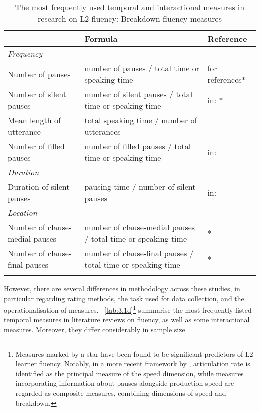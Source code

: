 \begin{table}[p]
\footnotesize
\caption{\label{tab:3.1b}The most frequently used temporal and interactional measures in research on L2 fluency: Breakdown fluency measures}
\begin{tabularx}{\textwidth}{Q@{}QQ}
\lsptoprule
{} & Formula & {Reference}\\
\midrule
\textit{Frequency} & ~ & ~\\
\midrule
Number of pauses & number of pauses / total time or speaking time & \citet{SaitoEtAl2018} for references*\\
Number of silent pauses & number of silent pauses / total time or speaking time & \citet{Kormos2006} in: \citet{DeJong2016}*\\
Mean length of utterance & total speaking time / number of utterances & \citet{DeJong2016}\\
Number of filled pauses & number of filled pauses / total time or speaking time & \citet{Kormos2006} in: \citet{DeJong2016}\\
\midrule
\textit{Duration} & ~ & ~\\
\midrule
Duration of silent pauses & pausing time / number of silent pauses & \citet{Kormos2006} in: \citet{DeJong2016}\\
\midrule
\textit{Location} & ~ & ~\\
\midrule
Number of clause-medial pauses & number of clause-medial pauses / total time or speaking time & \citet{SaitoEtAl2018}*\\
Number of clause-final pauses & number of clause-final pauses / total time or speaking time & \citet{SaitoEtAl2018}*\\
\lspbottomrule
\end{tabularx}
\end{table}


However, there are several differences in methodology across these studies, in particular regarding rating methods, the task used for data collection, and the operationalisation of measures. --\ref{tab:3.1d}\footnote{Measures marked by a star have been found to be significant predictors of L2 learner fluency. Notably, in a more recent framework by \citet{TavakoliNakatsuharaHunter2020}, articulation rate is identified as the principal measure of the speed dimension, while measures incorporating information about pauses alongside production speed are regarded as composite measures, combining dimensions of speed and breakdown.} summarise the most frequently listed temporal measures in literature reviews on fluency, as well as some interactional measures. Moreover, they differ considerably in sample size.

